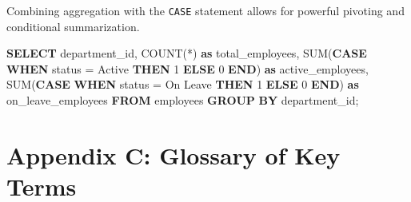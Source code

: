 \documentclass[
  11pt,
  openany,
  oneside]{book}
\newenvironment{Shaded}{}{}
\newcommand{\ControlFlowTok}[1]{\textcolor[rgb]{0.00,0.44,0.13}{\textbf{#1}}}
\newcommand{\DecValTok}[1]{\textcolor[rgb]{0.25,0.63,0.44}{#1}}
\newcommand{\FunctionTok}[1]{\textcolor[rgb]{0.02,0.16,0.49}{#1}}
\newcommand{\KeywordTok}[1]{\textcolor[rgb]{0.00,0.44,0.13}{\textbf{#1}}}
\newcommand{\NormalTok}[1]{#1}
\newcommand{\OperatorTok}[1]{\textcolor[rgb]{0.40,0.40,0.40}{#1}}
\newcommand{\StringTok}[1]{\textcolor[rgb]{0.25,0.44,0.63}{#1}}
\begin{document}
Combining aggregation with the \texttt{CASE} statement allows for
powerful pivoting and conditional summarization.

\begin{Shaded}
\begin{Highlighting}[]
\KeywordTok{SELECT} 
\NormalTok{    department\_id,}
    \FunctionTok{COUNT}\NormalTok{(}\OperatorTok{*}\NormalTok{) }\KeywordTok{as}\NormalTok{ total\_employees,}
    \FunctionTok{SUM}\NormalTok{(}\ControlFlowTok{CASE} \ControlFlowTok{WHEN}\NormalTok{ status }\OperatorTok{=} \StringTok{\textquotesingle{}Active\textquotesingle{}} \ControlFlowTok{THEN} \DecValTok{1} \ControlFlowTok{ELSE} \DecValTok{0} \ControlFlowTok{END}\NormalTok{) }\KeywordTok{as}\NormalTok{ active\_employees,}
    \FunctionTok{SUM}\NormalTok{(}\ControlFlowTok{CASE} \ControlFlowTok{WHEN}\NormalTok{ status }\OperatorTok{=} \StringTok{\textquotesingle{}On Leave\textquotesingle{}} \ControlFlowTok{THEN} \DecValTok{1} \ControlFlowTok{ELSE} \DecValTok{0} \ControlFlowTok{END}\NormalTok{) }\KeywordTok{as}\NormalTok{ on\_leave\_employees}
\KeywordTok{FROM}\NormalTok{ employees}
\KeywordTok{GROUP} \KeywordTok{BY}\NormalTok{ department\_id;}
\end{Highlighting}
\end{Shaded}

\bigskip

\section{Appendix C: Glossary of Key
Terms}\label{appendix-c-glossary-of-key-terms}
\end{document}
